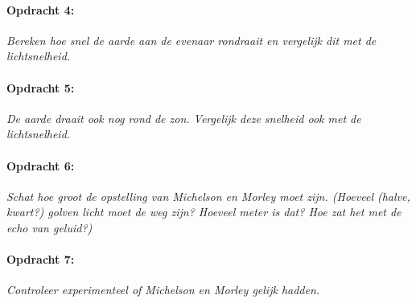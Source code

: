 \paragraph*{Opdracht 4:} \emph{Bereken hoe snel de aarde aan de evenaar rondraait
en vergelijk dit met de lichtsnelheid.}

\paragraph*{Opdracht 5:} \emph{De aarde draait ook nog rond de zon. Vergelijk deze
snelheid ook met de lichtsnelheid.}

\paragraph*{Opdracht 6:} \emph{Schat hoe groot de opstelling van Michelson en Morley
moet zijn. (Hoe\-veel (halve, kwart?) golven licht moet de weg zijn?
Hoeveel meter is dat? Hoe zat het met de echo van geluid?)}

\paragraph*{Opdracht 7:} \emph{Controleer experimenteel of Michelson en Morley
gelijk hadden.}


